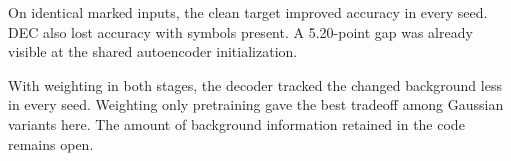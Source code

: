 \par
On identical marked inputs, the clean target improved accuracy in every seed. DEC also lost accuracy with symbols present. A 5.20-point gap was already visible at the shared autoencoder initialization.
\par\bigskip
{}\par
With weighting in both stages, the decoder tracked the changed background less in every seed. Weighting only pretraining gave the best tradeoff among Gaussian variants here. The amount of background information retained in the code remains open.
